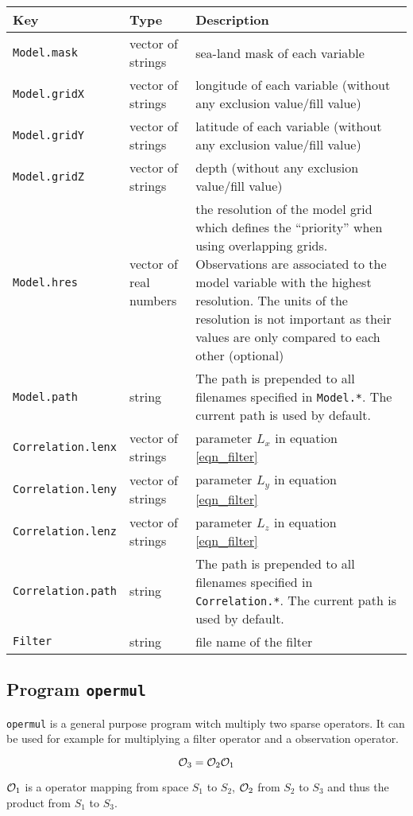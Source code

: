 \documentclass[a4paper,12pt]{article}
\newcommand{\code}{\texttt}
\newenvironment{keytabular}{\begin{tabular}{|p{0.3\textwidth}|p{0.2\textwidth}|p{0.5\textwidth}|} \hline Key & Type & Description \\ \hline \hline }{\end{tabular}}
\begin{document}
\begin{keytabular}
\code{Model.mask} & vector of strings &  sea-land mask of each variable 
\\
\code{Model.gridX} & vector of strings & longitude of each variable (without any exclusion value/fill value)
\\
\code{Model.gridY} & vector of strings & latitude of each variable (without any exclusion value/fill value)
\\
\code{Model.gridZ} & vector of strings & depth (without any exclusion value/fill value)
\\
\code{Model.hres} & vector of real numbers & the resolution of the model grid which defines the ``priority'' when using overlapping grids. Observations are associated to the model variable with the highest resolution. The units of the resolution is not important as their values are only compared to each other (optional)
\\
\code{Model.path} & string & The path is prepended to all filenames
specified in \code{Model.*}. The current path is used by default.
\\
\code{Correlation.lenx} & vector of strings & parameter $L_x$ in equation \ref{eqn_filter}
\\
\code{Correlation.leny} & vector of strings & parameter $L_y$ in equation \ref{eqn_filter}
\\
\code{Correlation.lenz} & vector of strings & parameter $L_z$ in equation \ref{eqn_filter}
\\
\code{Correlation.path} & string & The path is prepended to all filenames
specified in \code{Correlation.*}. The current path is used by default.
\\
\code{Filter} & string & file name of the filter
\\
\hline
\end{keytabular}

\subsection{Program \code{opermul}}

\code{opermul} is a general purpose program witch multiply two sparse operators. It can be used for example for multiplying a filter operator and a observation operator.

\begin{equation}
{\cal O}_3 = {\cal O}_2 {\cal O}_1  
\end{equation}

${\cal O}_1$ is a operator mapping from space $S_1$ to $S_2$, ${\cal O}_2$ from $S_2$ to $S_3$ and thus the product from  $S_1$ to $S_3$.
 
\end{document}
